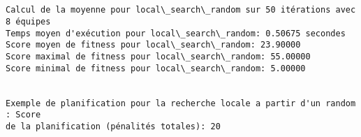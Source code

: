 \documentclass[11pt]{article}
\begin{document}
    \begin{Verbatim}[commandchars=\\\{\}]


Calcul de la moyenne pour local\_search\_random sur 50 itérations avec 8 équipes
Temps moyen d'exécution pour local\_search\_random: 0.50675 secondes
Score moyen de fitness pour local\_search\_random: 23.90000
Score maximal de fitness pour local\_search\_random: 55.00000
Score minimal de fitness pour local\_search\_random: 5.00000


Exemple de planification pour la recherche locale a partir d'un random : Score
de la planification (pénalités totales): 20
    \end{Verbatim}

    \begin{center}
    \end{center}
    { \hspace*{\fill} \\}
    
    \begin{center}
    \end{center}
    { \hspace*{\fill} \\}
    
\end{document}

